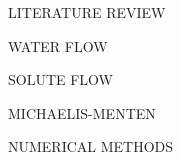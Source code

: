 \cleardoublepage
\chap LITERATURE REVIEW

\sec WATER FLOW

\sec SOLUTE FLOW

\secc MICHAELIS-MENTEN

\sec NUMERICAL METHODS

